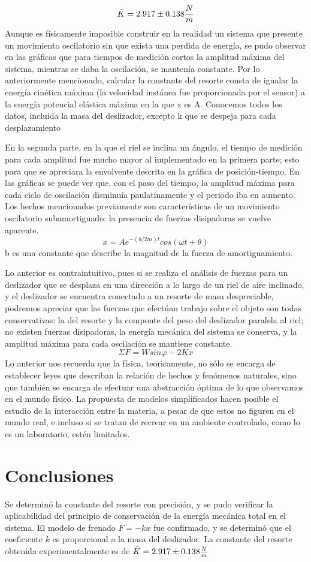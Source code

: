 \documentclass{article}
\begin{document}
 \[\Bar{K} = 2.917 \pm 0.138\frac{N}{m} \]
Aunque es físicamente imposible construir en la realidad un sistema que presente un movimiento oscilatorio sin que exista una perdida de energía, se pudo observar en las gráficas que para tiempos de medición cortos la amplitud máxima del sistema, mientras se daba la oscilación, se mantenía constante.
Por lo anteriormente mencionado, calcular la constante del resorte consta de igualar la energía cinética máxima (la velocidad instánea fue proporcionada por el sensor) a la energía potencial elástica máxima en la que x es A. Conocemos todos los datos, incluida la masa del deslizador, excepto k que se despeja para cada desplazamiento 

En la segunda parte, en la que el riel se inclina un ángulo, el tiempo de medición para cada amplitud fue mucho mayor al implementado en la primera parte; esto para que se apreciara la envolvente descrita en la gráfica de posición-tiempo. 
En las gráficas se puede ver que, con el paso del tiempo, la amplitud máxima para cada ciclo de oscilación disminuía paulatinamente y el periodo iba en aumento.
Los hechos mencionados previamente son características de un movimiento oscilatorio subamortiguado: la presencia de fuerzas disipadoras se vuelve aparente.
\[x = Ae^{-(b/2m)t}cos(\omega t + \theta)\]
b es una constante que describe la magnitud de la fuerza de amortiguamiento.

Lo anterior es contraintuitivo, pues si se realiza el análisis de fuerzas para un deslizador que se desplaza en una dirección a lo largo de un riel de aire inclinado, y el deslizador se encuentra conectado a un resorte de masa despreciable, podremos apreciar que las fuerzas que efectúan trabajo sobre el objeto son todas conservativas: la del resorte y la componte del peso del deslizador paralela al riel;  no existen fuerzas disipadoras, la energía mecánica del sistema se conserva, y la amplitud máxima para cada oscilación se mantiene constante.
\[\Sigma F = Wsin\varphi - 2Kx\]
Lo anterior nos recuerda que la física, teoricamente, no sólo se encarga de establecer leyes que describan la relación de hechos y fenómenos naturales, sino que también se encarga de efectuar una abstracción óptima de lo que observamos en el mundo físico. La propuesta de modelos simplificados hacen posible el estudio de la interacción entre la materia, a pesar de que estos no figuren en el mundo real, e incluso si se tratan de recrear en un ambiente controlado, como lo es un laboratorio, estén limitados.

\section{Conclusiones}
Se determinó la constante del resorte con precisión, y se pudo verificar la aplicabilidad del principio de conservación de la energía mecánica total en el sistema. El modelo de frenado \( F = -kx \) fue confirmado, y se determinó que el coeficiente \( k \) es proporcional a la masa del deslizador. La constante del resorte obtenida experimentalmente es de $\Bar{K} = 2.917 \pm 0.138\frac{N}{m}$\\
\end{document}
